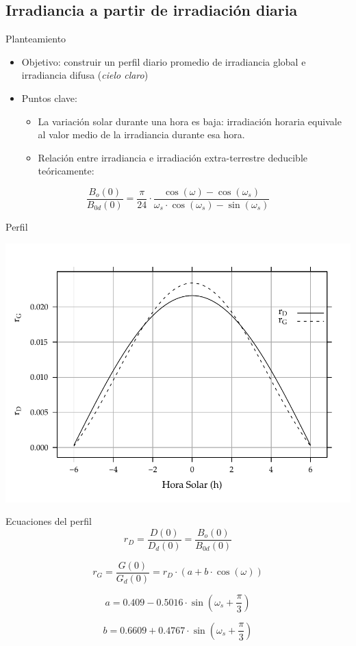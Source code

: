 \documentclass[xcolor={usenames,svgnames,dvipsnames}]{beamer}
\begin{document}
\subsection{Irradiancia a partir de irradiación diaria}
\label{sec:org9f52ca4}

\begin{frame}[label={sec:org4a09df7}]{Planteamiento}
\begin{itemize}
\item \alert{Objetivo}: construir un perfil diario promedio de irradiancia global e irradiancia difusa (\emph{cielo claro})
\item \alert{Puntos clave}:
\begin{itemize}
\item La variación solar durante una hora es baja: irradiación horaria equivale al valor medio de la irradiancia durante esa hora.
\item Relación entre irradiancia e irradiación extra-terrestre deducible teóricamente:
\end{itemize}
\end{itemize}

\[
\frac{B_{o}(0)}{B_{0d}(0)}=\frac{\pi}{24}\cdot\frac{\cos(\omega)-\cos(\omega_{s})}{\omega_{s}\cdot\cos(\omega_{s})-\sin(\omega_{s})}
\]
\end{frame}

\begin{frame}[label={sec:orgb6bc5c7}]{Perfil}
\begin{center}
\includegraphics[width=.9\linewidth]{../figs/RgRd.pdf}
\end{center}
\end{frame}

\begin{frame}[label={sec:org1769d05}]{Ecuaciones del perfil}
\[r_{D}=\frac{D(0)}{D_{d}(0)}=\frac{B_{o}(0)}{B_{0d}(0)}\]

\[r_{G}=\frac{G(0)}{G_{d}(0)}=r_{D}\cdot\left(a+b\cdot\cos(\omega)\right)\]

\[a=0.409-0.5016\cdot\sin(\omega_{s}+\frac{\pi}{3})\]

\[b=0.6609+0.4767\cdot\sin(\omega_{s}+\frac{\pi}{3})\]
\end{frame}
\end{document}
